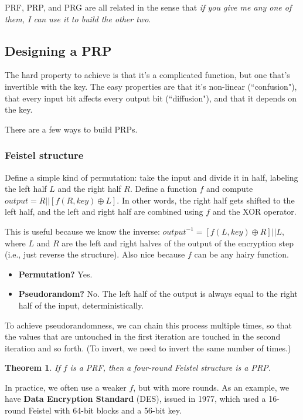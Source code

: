 \documentclass[12pt]{article}
\newtheorem{thm}{Theorem}[section]
\begin{document}
PRF, PRP, and PRG are all related in the sense that \textit{if you give me any one of them, I can use it to build the other two}.

\subsection*{Designing a PRP}

The hard property to achieve is that it's a complicated function, but one that's invertible with the key. The easy properties are that it's non-linear (``confusion"), that every input bit affects every output bit (``diffusion"), and that it depends on the key.

There are a few ways to build PRPs.

\subsubsection*{Feistel structure}

Define a simple kind of permutation: take the input and divide it in half, labeling the left half $L$ and the right half $R$. Define a function $f$ and compute $output = R || [f(R, key) \oplus L]$. In other words, the right half gets shifted to the left half, and the left and right half are combined using $f$ and the XOR operator.

This is useful because we know the inverse: $output^{-1} = [f(L, key) \oplus R] || L$, where $L$ and $R$ are the left and right halves of the output of the encryption step (i.e., just reverse the structure). Also nice because $f$ can be any hairy function.

\begin{itemize}
\item \textbf{Permutation?} Yes.
\item \textbf{Pseudorandom?} No. The left half of the output is always equal to the right half of the input, deterministically.
\end{itemize}

To achieve pseudorandomness, we can chain this process multiple times, so that the values that are untouched in the first iteration are touched in the second iteration and so forth. (To invert, we need to invert the same number of times.)

\begin{thm}
If $f$ is a PRF, then a four-round Feistel structure is a PRP.
\end{thm}

In practice, we often use a weaker $f$, but with more rounds. As an example, we have \textbf{Data Encryption Standard} (DES), issued in 1977, which used a 16-round Feistel with 64-bit blocks and a 56-bit key.
\end{document}
